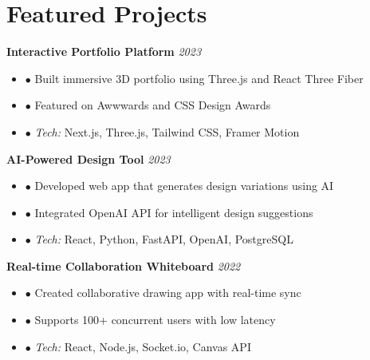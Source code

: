 \documentclass[11pt]{article}
\begin{document}
\vspace{0.2cm}

\section*{Featured Projects}

\textbf{\color{accentcolor}Interactive Portfolio Platform} \hfill \textit{2023}
\begin{itemize}[leftmargin=*, itemsep=2pt]
    \item {\color{primarycolor}$\bullet$} Built immersive 3D portfolio using Three.js and React Three Fiber
    \item {\color{primarycolor}$\bullet$} Featured on Awwwards and CSS Design Awards
    \item {\color{primarycolor}$\bullet$} \textit{Tech:} Next.js, Three.js, Tailwind CSS, Framer Motion
\end{itemize}

\vspace{0.1cm}

\textbf{\color{accentcolor}AI-Powered Design Tool} \hfill \textit{2023}
\begin{itemize}[leftmargin=*, itemsep=2pt]
    \item {\color{primarycolor}$\bullet$} Developed web app that generates design variations using AI
    \item {\color{primarycolor}$\bullet$} Integrated OpenAI API for intelligent design suggestions
    \item {\color{primarycolor}$\bullet$} \textit{Tech:} React, Python, FastAPI, OpenAI, PostgreSQL
\end{itemize}

\vspace{0.1cm}

\textbf{\color{accentcolor}Real-time Collaboration Whiteboard} \hfill \textit{2022}
\begin{itemize}[leftmargin=*, itemsep=2pt]
    \item {\color{primarycolor}$\bullet$} Created collaborative drawing app with real-time sync
    \item {\color{primarycolor}$\bullet$} Supports 100+ concurrent users with low latency
    \item {\color{primarycolor}$\bullet$} \textit{Tech:} React, Node.js, Socket.io, Canvas API
\end{itemize}

\vspace{0.2cm}
\end{document}
